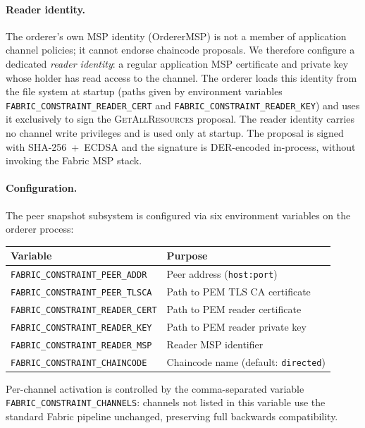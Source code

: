 \paragraph{Reader identity.}
The orderer's own MSP identity (OrdererMSP) is not a member of application
channel policies; it cannot endorse chaincode proposals.  We therefore
configure a dedicated \emph{reader identity}: a regular application MSP
certificate and private key whose holder has read access to the channel.
The orderer loads this identity from the file system at startup (paths given by
environment variables \texttt{FABRIC\_CONSTRAINT\_READER\_CERT} and
\texttt{FABRIC\_CONSTRAINT\_READER\_KEY}) and uses it exclusively to sign the
\textsc{GetAllResources} proposal.  The reader identity carries no channel write
privileges and is used only at startup.  The proposal is signed with
SHA-256~+~ECDSA and the signature is DER-encoded in-process, without invoking
the Fabric MSP stack.

\paragraph{Configuration.}
The peer snapshot subsystem is configured via six environment variables on
the orderer process:
\begin{center}
\begin{tabular}{ll}
\toprule
Variable & Purpose \\
\midrule
\texttt{FABRIC\_CONSTRAINT\_PEER\_ADDR}   & Peer address (\texttt{host:port}) \\
\texttt{FABRIC\_CONSTRAINT\_PEER\_TLSCA}  & Path to PEM TLS CA certificate \\
\texttt{FABRIC\_CONSTRAINT\_READER\_CERT} & Path to PEM reader certificate \\
\texttt{FABRIC\_CONSTRAINT\_READER\_KEY}  & Path to PEM reader private key \\
\texttt{FABRIC\_CONSTRAINT\_READER\_MSP}  & Reader MSP identifier \\
\texttt{FABRIC\_CONSTRAINT\_CHAINCODE}    & Chaincode name (default: \texttt{directed}) \\
\bottomrule
\end{tabular}
\end{center}
Per-channel activation is controlled by the comma-separated variable
\texttt{FABRIC\_CONSTRAINT\_CHANNELS}: channels not listed in this variable
use the standard Fabric pipeline unchanged, preserving full backwards
compatibility.

